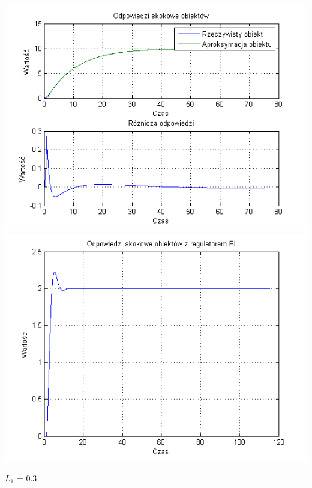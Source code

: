 \documentclass[10pt,a4paper]{article}
\begin{document}
\begin{center}
\includegraphics[scale=1]{images/jeden/skrypt_213.png}\\
\includegraphics[scale=1]{images/jeden/skrypt_214.png}\\
\end{center}
\newpage
$L_1$ = 0.3
\end{document}
